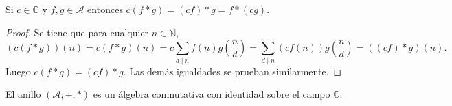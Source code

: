\begin{proposition}
Si $c \in \mathbb{C}$ y $f, g \in \mathcal{A}$ entonces $c(f*g)=(c f)*g=f*(c g)$.
\end{proposition}
\begin{proof}
Se tiene que para cualquier $n \in \mathbb{N}$,
\begin{equation*}
    (c(f*g))(n) = c(f*g)(n) = c \sum_{d \mid n} f(n) g \left( \frac{n}{d} \right) = \sum_{d \mid n} (c f(n)) g \left( \frac{n}{d} \right) = ((c f)*g)(n).
\end{equation*}
Luego $c(f*g)=(c f)*g$. Las demás igualdades se prueban similarmente.
\end{proof}

\begin{corollary}\label{cor:est1}
El anillo $(\mathcal{A},+,*)$ es un álgebra conmutativa con identidad sobre el campo $\mathbb{C}$.
\end{corollary}

